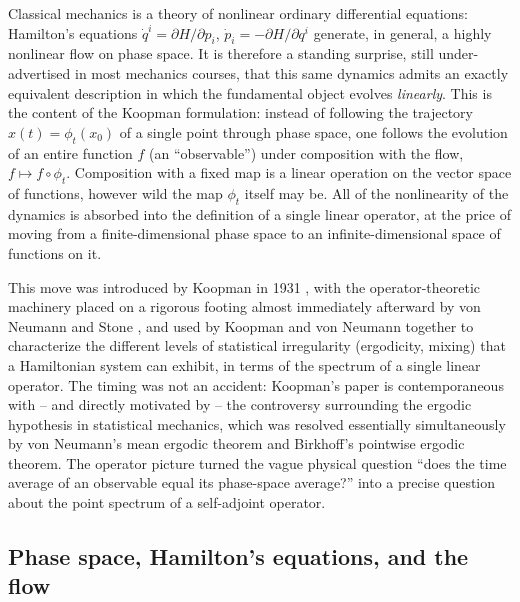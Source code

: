 Classical mechanics is
a theory of nonlinear ordinary differential equations: Hamilton's equations
$\dot q^i = \partial H/\partial p_i$, $\dot p_i = -\partial H/\partial q^i$
generate, in general, a highly nonlinear flow on phase space. It is therefore a
standing surprise, still under-advertised in most mechanics courses, that this
same dynamics admits an exactly equivalent description in which the fundamental
object evolves \emph{linearly}. This is the content of the Koopman formulation:
instead of following the trajectory $x(t)=\phi_t(x_0)$ of a single point
through phase space, one follows the evolution of an entire function $f$ (an
``observable'') under composition with the flow, $f \mapsto f\circ\phi_t$.
Composition with a fixed map is a linear operation on the vector space of
functions, however wild the map $\phi_t$ itself may be. All of the nonlinearity
of the dynamics is absorbed into the definition of a single linear operator, at
the price of moving from a finite-dimensional phase space to an
infinite-dimensional space of functions on it.

This move was introduced by Koopman in 1931 \cite{koopman}, with the
operator-theoretic machinery placed on a rigorous footing almost immediately
afterward by von Neumann \cite{vonNeumann1932} and Stone \cite{stone}, and used
by Koopman and von Neumann together to characterize the different levels of
statistical irregularity (ergodicity, mixing) that a Hamiltonian system can
exhibit, in terms of the spectrum of a single linear operator.
The timing was not an accident: Koopman's paper
is contemporaneous with -- and directly motivated by -- the controversy
surrounding the ergodic hypothesis in statistical mechanics, which was resolved
essentially simultaneously by von Neumann's mean ergodic theorem and Birkhoff's
pointwise ergodic theorem. The operator picture turned the
vague physical question ``does the time average of an observable equal its
phase-space average?'' into a precise question about the point spectrum of a
self-adjoint operator.

\subsection{Phase space, Hamilton's equations, and the flow}

